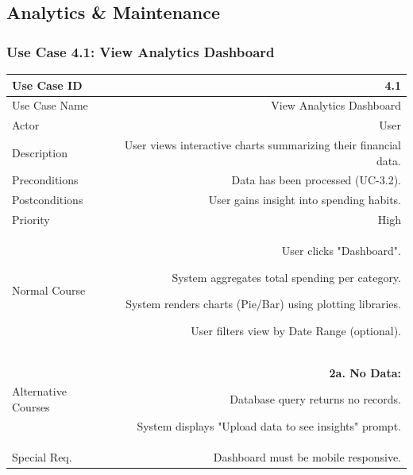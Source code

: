 \newpage

\subsection{Analytics \& Maintenance}

\subsubsection{Use Case 4.1: View Analytics Dashboard}
\begin{tabularx}{\textwidth}{|L|R|}
	\hline
	Use Case ID & 4.1 \\ \hline
	Use Case Name & View Analytics Dashboard \\ \hline
	Actor & User \\ \hline
	Description & User views interactive charts summarizing their financial data. \\ \hline
	Preconditions & Data has been processed (UC-3.2). \\ \hline
	Postconditions & User gains insight into spending habits. \\ \hline
	Priority & High \\ \hline
	Normal Course & 
	\begin{normalsteps}
		\item User clicks "Dashboard".
		\item System aggregates total spending per category.
		\item System renders charts (Pie/Bar) using plotting libraries.
		\item User filters view by Date Range (optional).
	\end{normalsteps} \\ \hline
	Alternative Courses & 
	\textbf{2a. No Data:} 
	\begin{altsteps}
		\item Database query returns no records.
		\item System displays "Upload data to see insights" prompt.
	\end{altsteps} \\ \hline
	Special Req. & Dashboard must be mobile responsive. \\ \hline
\end{tabularx}

\vspace{0.5cm}

